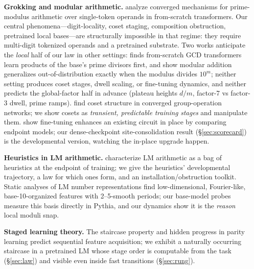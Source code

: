 \documentclass{article} %
\begin{document}
\textbf{Grokking and modular arithmetic.} \citet{power2022grokking,nanda2023progress,gromov2023grokking,zhong2023clock} analyze converged mechanisms for prime-modulus arithmetic over single-token operands in from-scratch transformers. Our central phenomena---digit-locality, coset staging, composition obstruction, pretrained local bases---are structurally impossible in that regime: they require multi-digit tokenized operands and a pretrained substrate. Two works anticipate the \emph{local} half of our law in other settings: \citet{charton2024gcd} finds from-scratch GCD transformers learn products of the base's prime divisors first, and \citet{xu2025principled} show modular addition generalizes out-of-distribution exactly when the modulus divides $10^m$; neither setting produces coset stages, dwell scaling, or fine-tuning dynamics, and neither predicts the global-factor half in advance (plateau heights $d/m$, factor-7 vs factor-3 dwell, prime ramps). \citet{stander2023cosets} find coset structure in converged group-operation networks; we show cosets as \emph{transient, predictable training stages} and manipulate them. \citet{prakash2024finetuning} show fine-tuning enhances an existing circuit in place by comparing endpoint models; our dense-checkpoint site-consolidation result (\S\ref{sec:scorecard}) is the developmental version, watching the in-place upgrade happen.

\textbf{Heuristics in LM arithmetic.} \citet{nikankin2025arithmetic} characterize LM arithmetic as a bag of heuristics at the endpoint of training; we give the heuristics' developmental trajectory, a law for which ones form, and an installation/obstruction toolkit. Static analyses of LM number representations \citep{levy2024digits,zhou2024fourier,kantamneni2025trig,subspaces2025addition} find low-dimensional, Fourier-like, base-10-organized features with 2--5-smooth periods; our base-model probes measure this basis directly in Pythia, and our dynamics show it is the \emph{reason} local moduli snap.

\textbf{Staged learning theory.} The staircase property \citep{abbe2021staircase} and hidden progress in parity learning \citep{barak2022hidden} predict sequential feature acquisition; we exhibit a naturally occurring staircase in a pretrained LM whose stage order is computable from the task (\S\ref{sec:law}) and visible even inside fast transitions (\S\ref{sec:rung}).
\end{document}

